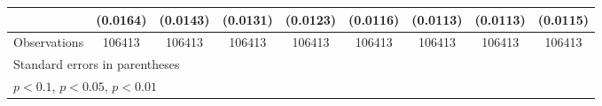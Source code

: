 {\begin{tabular}{l*{8}{c}}
                    &    (0.0164)         &    (0.0143)         &    (0.0131)         &    (0.0123)         &    (0.0116)         &    (0.0113)         &    (0.0113)         &    (0.0115)         \\
\hline
Observations        &      106413         &      106413         &      106413         &      106413         &      106413         &      106413         &      106413         &      106413         \\
\hline\hline
\multicolumn{9}{l}{\footnotesize Standard errors in parentheses}\\
\multicolumn{9}{l}{\footnotesize \sym{*} \(p<0.1\), \sym{**} \(p<0.05\), \sym{***} \(p<0.01\)}\\
\end{tabular}
}

